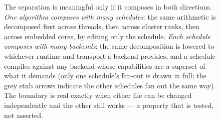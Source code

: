 \begin{figure}[tbp]
  \caption[Algorithm/schedule/backend composition]{The separation is meaningful
    only if it composes in both directions. \emph{One algorithm composes with
    many schedules}: the same arithmetic is decomposed first across threads, then
    across cluster ranks, then across embedded cores, by editing only the
    schedule. \emph{Each schedule composes with many backends}: the same
    decomposition is lowered to whichever runtime and transport a backend
    provides, and a schedule compiles against any backend whose capabilities are
    a superset of what it demands (only one schedule's fan-out is drawn in full;
    the grey stub arrows indicate the other schedules fan out the same way). The
    boundary is real exactly when either file can be changed independently and the
    other still works --- a property that is tested, not asserted.}
  \label{fig:composition}
\end{figure}
